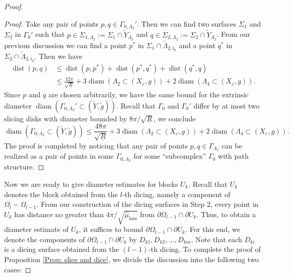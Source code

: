 \documentclass[11pt,letterpaper]{amsart}
\numberwithin{equation}{section}
\theoremstyle{definition}
\DeclareMathOperator{\dist}{dist}
\DeclareMathOperator{\diam}{diam}
\newcommand{\ve}{\varepsilon}
\newcommand{\ti}[1]{\tilde{#1}}
\begin{document}
\begin{proof}
\begin{proof}
Take any pair of points $p,q\in \Gamma_{0,\Lambda_2}'$. Then we can find two surfaces $\Sigma_1$ and $\Sigma_2$ in $\Gamma_0'$ such that $p\in \Sigma_{1,\Lambda_2}:=\Sigma_{1}\cap\ti{Y}_{\Lambda_{2}}$ and $q\in \Sigma_{2,\Lambda_2}:=\Sigma_{2}\cap\ti{Y}_{\Lambda_{2}}$. From our previous discussion we can find a point $p^*$ in $\Sigma_1\cap \tilde \Lambda_{2,i_0}$ and a point $q^*$ in $\Sigma_2\cap \tilde \Lambda_{2,i_0}$. Then we have
\[
\begin{split}
\dist(p,q)&\leq \dist(p,p^*)+\dist(p^*,q^*)+\dist(q^*,q)\\
&\leq \frac{32\pi}{\sqrt{\underline R}}+3\diam(\Lambda_2\subset(X_\ve,g))+2\diam(\Lambda_4\subset(X_\ve,g)).
\end{split}
\]
Since $p$ and $q$ are chosen arbitrarily, we have the same bound for the extrinsic diameter $\diam(\Gamma_{0,\Lambda_2}'\subset(\tilde Y,\tilde g))$.
Recall that $\Gamma_0$ and $\Gamma_0'$ differ by at most two slicing disks with diameter bounded by $8\pi/\sqrt{\underline R}$, we conclude
$$
\diam(\Gamma_{0,\Lambda_2}\subset(\tilde Y,\tilde g))\leq \frac{48\pi}{\sqrt{\underline R}}+3\diam(\Lambda_2\subset(X_\ve,g))+2\diam(\Lambda_4\subset(X_\ve,g)).
$$
The proof is completed by noticing that any pair of points $p,q\in \Gamma_{\Lambda_2}$ can be realized as a pair of points in some $\Gamma_{0,\Lambda_2}$ for some ``subcomplex'' $\Gamma_0$ with path structure.
\end{proof}


Now we are ready to give diameter estimates for blocks $U_k$. Recall that $U_k$ denotes the block obtained from the $l$-th dicing, namely a component of $\Omega_l-\Omega_{l-1}$. From our construction of the dicing surfaces in Step 2, every point in $U_k$ has distance no greater than $4\pi/\sqrt{\hat \mu_{\mathrm{loss}}}$ from $\partial\Omega_{l-1} \cap \partial U_k$. Thus, to obtain a diameter estimate of $U_k$, it suffices to bound $\partial\Omega_{l-1}\cap \partial U_k$. For this end, we denote the components of $\partial\Omega_{l-1}\cap \partial U_k$ by $D_{k1}, D_{k2}, \ldots, D_{km}$. {Note that each $D_{ki}$ is a dicing surface obtained from the $(l-1)$-th dicing. To complete the proof of Proposition \ref{Prop: slice and dice}}, we divide the discussion into the following two cases:

\medskip


\end{proof}
\end{document}
